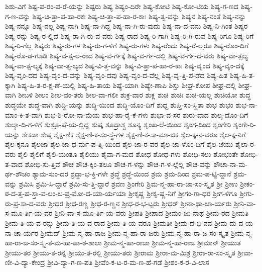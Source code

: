 {ಶಿಶು-ವಿಗೆ
ಶಿಷ್ಟ-ಪ-ರಂ-ಪ-ರೆ-ಯನ್ನು
ಶಿಷ್ಟರು
ಶಿಷ್ಯ
ಶಿಷ್ಯಂ-ದಿರೇ
ಶಿಷ್ಯ-ಕೋಟಿ
ಶಿಷ್ಯ-ಕೋ-ಟಿಯ
ಶಿಷ್ಯ-ಗ-ಣದ
ಶಿಷ್ಯ-ಗ-ಣ-ವನ್ನು
ಶಿಷ್ಯ-ಚಿ-ತ್ತಾ-ಪ-ಹಾ-ರಕಃ
ಶಿಷ್ಯ-ಚಿ-ತ್ತಾ-ಪ-ಹಾ-ರ-ಕಾಃ
ಶಿಷ್ಯ-ತ್ವ-ವನ್ನು
ಶಿಷ್ಯನ
ಶಿಷ್ಯ-ನಂತೆ
ಶಿಷ್ಯ-ನನ್ನು
ಶಿಷ್ಯ-ನನ್ನೂ
ಶಿಷ್ಯ-ನಲ್ಲ
ಶಿಷ್ಯ-ನಾಗಿ
ಶಿಷ್ಯ-ನಾ-ಗಿದ್ದ
ಶಿಷ್ಯ-ನಾ-ಗಿ-ರು-ವುದು
ಶಿಷ್ಯ-ನಾ-ದ-ವನು
ಶಿಷ್ಯ-ನಿ-ಗಿಂತ
ಶಿಷ್ಯರ
ಶಿಷ್ಯ-ರನ್ನು
ಶಿಷ್ಯ-ರ-ಲ್ಲಿದೆ
ಶಿಷ್ಯ-ರಾ-ಗಿ-ರು-ವ-ವರು
ಶಿಷ್ಯ-ರಾದ
ಶಿಷ್ಯ-ರಿ-ಗಾಗಿ
ಶಿಷ್ಯ-ರಿ-ಗಿ-ರುವ
ಶಿಷ್ಯ-ರಿಗೂ
ಶಿಷ್ಯ-ರಿಗೆ
ಶಿಷ್ಯ-ರಿ-ಗೆಲ್ಲ
ಶಿಷ್ಯರು
ಶಿಷ್ಯ-ರು-ಗಳ
ಶಿಷ್ಯ-ರು-ಗ-ಳಿಗೆ
ಶಿಷ್ಯ-ರು-ಗಳು
ಶಿಷ್ಯ-ರೆಂದು
ಶಿಷ್ಯ-ರೆ-ಲ್ಲರೂ
ಶಿಷ್ಯ-ರೊಂ-ದಿಗೆ
ಶಿಷ್ಯ-ರೊ-ಡ-ಗೂಡಿ
ಶಿಷ್ಯ-ವ-ತ್ಸ-ಲ-ರಾದ
ಶಿಷ್ಯ-ವ-ರ್ಗಕ್ಕೆ
ಶಿಷ್ಯ-ವ-ರ್ಗ-ದಲ್ಲಿ
ಶಿಷ್ಯ-ವ-ರ್ಗ-ದ-ವರು
ಶಿಷ್ಯ-ವಾ-ತ್ಸಲ್ಯ
ಶಿಷ್ಯ-ವಾ-ತ್ಸ-ಲ್ಯಕ್ಕೆ
ಶಿಷ್ಯ-ವಾ-ತ್ಸ-ಲ್ಯದ
ಶಿಷ್ಯ-ವಿ-ತ್ತ-ವನ್ನು
ಶಿಷ್ಯ-ವಿ-ತ್ತಾ-ಪ-ಹಾ-ರ-ಕಾಃ
ಶಿಷ್ಯ-ವೃಂದ
ಶಿಷ್ಯ-ವೃಂ-ದಕ್ಕೆ
ಶಿಷ್ಯ-ವೃಂ-ದದ
ಶಿಷ್ಯ-ವೃಂ-ದ-ವನ್ನು
ಶಿಷ್ಯ-ವೃಂ-ದವು
ಶಿಷ್ಯ-ವೃಂ-ದ-ವೆಲ್ಲ
ಶಿಷ್ಯ-ವೃ-ತ್ತಿ-ಪ-ಡೆದ
ಶಿಷ್ಯ-ಹಿತ
ಶಿಷ್ಯ-ಹಿ-ತ-ಕ್ಕಾಗಿ
ಶಿಷ್ಯ-ಹಿ-ತ-ರ-ಕ್ಷ-ಣೆ-ಯಲ್ಲಿ
ಶಿಷ್ಯ-ಹಿ-ತಾಯ
ಶಿಷ್ಯೆ-ಯಾಗಿ
ಶಿಷ್ಯೇ-ಣಾಪಿ
ಶಿಸ್ತು
ಶೀಘ್ರ-ಕೋಪ
ಶೀಘ್ರ-ದಲ್ಲಿ
ಶೀಘ್ರ-ವಾಗಿ
ಶೀಬಳಿ
ಶೀಲಂ
ಶೀಲ-ವಂ-ತರು
ಶೀಲ-ವಾ-ಗಲೀ
ಶುಕ್ರ-ವಾರ
ಶುಕ್ಲ
ಶುಚಿ
ಶುಚಿಃ
ಶುಚಿ-ಯಲ್ಲ
ಶುಚಿಯೋ
ಶುದ್ಧ
ಶುದ್ಧಯೇ
ಶುದ್ಧ-ವಾಗಿ
ಶುದ್ಧಿ-ಯನ್ನು
ಶುದ್ಧಿ-ಯಿಂದ
ಶುದ್ಧಿ-ಯೊಂ-ದಿಗೆ
ಶುಧ್ದ
ಶುಪ್ತಿ-ಸಂ-ಸ್ಥಿತಾ
ಶುಭ
ಶುಭಂ
ಶುಭ-ನಾ-ಮಾಂ-ಕಿ-ತ-ವಾಗಿ
ಶುಭ-ಶಿ-ರೋ-ನಾ-ಮೆಯ
ಶುಭ-ಹಾ-ರೈ-ಕೆ-ಗಳು
ಶುಭಾ-ವ-ಸರ
ಶುರು-ವಾದ
ಶುಲ್ಕ-ದೊಂ-ದಿಗೆ
ಶುಲ್ಕಾ-ದಿ-ಗ-ಳಿಗೆ
ಶುಶ್ರೂ-ಷೆ-ಯ-ಲ್ಲಿದ್ದ
ಶುಷ್ಕ
ಶೂದ್ರಾಶ್ಚ
ಶೂನ್ಯ
ಶೃಂಖ-ಲೆ-ಯಿಂದ
ಶೃಂಗ-ದಿಂದ
ಶೃಂಗೇರಿ
ಶೃಂಗೇ-ರಿ-ಯನ್ನು
ಶೇಕಡಾ
ಶೇಷ್ಠ
ಶೈಕ್ಷ-ಣಿಕ
ಶೈಕ್ಷ-ಣಿ-ಕ-ಸಂ-ಸ್ಥೆ-ಗಳ
ಶೈಕ್ಷ-ಣಿ-ಕ-ಸಾ-ಮಾ-ಜಿಕ
ಶೈಲ-ಕ್ಕ-ನ-ವರೂ
ಶೈಲ-ಕ್ಕ-ನಿಗೆ
ಶೈಲ-ಕ್ಕನೂ
ಶೈಲಜಾ
ಶೈಲ-ಜಾ-ಧ-ರ್ಮ-ಪ-ತ್ನಿ-ಯಿಂದ
ಶೈಲ-ಜಾ-ರ-ವರ
ಶೈಲ-ಜಾ-ಳೊಂ-ದಿಗೆ
ಶೈಲ-ಜೆಯು
ಶೈಲಾ-ರ-ವರು
ಶೈಲಿ
ಶೈಲಿಗೆ
ಶೈಲಿ-ಯಂತೂ
ಶೈಲಿಯು
ಶೈವಾ-ಗ-ಮದ
ಶೋಧ
ಶೋಧ-ಗಳು
ಶೋಧಿ-ಸಲು
ಶೋಭಂತೇ
ಶೋಭಿ-ತ-ವಾದ
ಶೋಭಿ-ಸು-ತ್ತಿವೆ
ಶೌಚ
ಶೌಚ-ಕ್ಕಿಂ-ತಲೂ
ಶೌಚ-ಗ-ಳನ್ನು
ಶೌಚ-ಗ-ಳ-ಲ್ಲೆಲ್ಲ
ಶೌಚ-ವನ್ನು
ಶೌಚಾ-ನಾ-ಮ-ರ್ಥ-ಶೌಚಂ
ಶ್ಯಾಮ-ಸುಂ-ದರ
ಶ್ರದ್ಧಾ-ಭ-ಕ್ತಿ-ಗಳೇ
ಶ್ರದ್ಧೆ
ಶ್ರದ್ಧೆ-ಯಿಂದ
ಶ್ರಮ
ಶ್ರಮ-ದಿಂದ
ಶ್ರಮ-ಪ-ಟ್ಟಿ-ದ್ದಾನೆ
ಶ್ರಮ-ವನ್ನು
ಶ್ರಮಿಸಿ
ಶ್ರಮಿ-ಸಿ-ದ್ದಾರೆ
ಶ್ರಮಿ-ಸು-ತ್ತಿ-ದ್ದಾರೆ
ಶ್ರವಣ
ಶ್ರಿಂಗೇರಿ
ಶ್ರಿಮ-ನ್ಮ-ಹಾ-ರಾ-ಜಾ-ಸಂ-ಸ್ಕೃತ
ಶ್ರೀ
ಶ್ರೀಉ
ಶ್ರೀಕಂ-ಠ-ದ-ತ್ತ-ಹ-ಸ್ತಾ-ವ-ಲಂ-ಬ-ಪ್ರ-ಮೋ-ದ-ಯಾ-ರ್ಯಯಾ
ಶ್ರೀಕೃಷ್ಣ
ಶ್ರೀಕೃ-ಷ್ಣ-ನಿಗೆ
ಶ್ರೀಗಂ-ಗಾ-ಧರ
ಶ್ರೀಗ-ಳಿಗೂ
ಶ್ರೀಗು-ರು-ಪ್ರ-ಸಾ-ದ-ವರು
ಶ್ರೀಧರ
ಶ್ರೀಧ-ರಣ್ಣ
ಶ್ರೀಧ-ರ-ಣ್ಣನ
ಶ್ರೀಧ-ರ-ಭ-ಟ್ಟರು
ಶ್ರೀಧರ್
ಶ್ರೀನಾ-ಥಾ-ಚಾ-ರ್ಯರು
ಶ್ರೀನಿ-ವಾ-ಸ-ಮೂ-ರ್ತಿ-ಯ-ವರ
ಶ್ರೀನಿ-ವಾ-ಸ-ಮೂ-ರ್ತಿ-ಯ-ವರು
ಶ್ರೀಪತಿ
ಶ್ರೀಪಾದ
ಶ್ರೀಮಂ-ಜು-ನಾಥ
ಶ್ರೀಮ-ಠದ
ಶ್ರೀಮತಿ
ಶ್ರೀಮ-ತಿ-ಯ-ವ-ರನ್ನು
ಶ್ರೀಮ-ತಿ-ಯ-ವ-ರಾದ
ಶ್ರೀಮ-ತಿ-ಯ-ವರೂ
ಶ್ರೀಮತೀ
ಶ್ರೀಮ-ದ-ಭಿ-ನವ
ಶ್ರೀಮ-ದು-ದ-ಯ-ನಾ-ಚಾ-ರ್ಯರ
ಶ್ರೀಮದ್
ಶ್ರೀಮ-ನ್ಮ-ಹಾ-ರಾಜ
ಶ್ರೀಮ-ನ್ಮ-ಹಾ-ರಾ-ಜರು
ಶ್ರೀಮ-ನ್ಮ-ಹಾ-ರಾ-ಜ-ಸಂ-ಸ್ಕೃತ
ಶ್ರೀಮ-ನ್ಮ-ಹಾ-ರಾ-ಜ-ಸಂ-ಸ್ಕೃ-ತ-ಮ-ಹಾ-ಪಾ-ಠ-ಶಾಲಾ
ಶ್ರೀಮ-ನ್ಮ-ಹಾ-ರಾಜಾ
ಶ್ರೀಮ-ನ್ಮ-ಹಾ-ರಾಜ
ಶ್ರೀಮಾನ್
ಶ್ರೀಯುತ
ಶ್ರೀಯು-ತರ
ಶ್ರೀಯು-ತ-ರನ್ನ
ಶ್ರೀಯು-ತ-ರಲ್ಲಿ
ಶ್ರೀಯು-ತರು
ಶ್ರೀರಾಮ
ಶ್ರೀರಾ-ಮ-ಮಿಶ್ರ
ಶ್ರೀರಾ-ರಾ-ಸಂ-ಸ್ಕೃತ
ಶ್ರೀವಾ-ಣೀ-ವಿ-ದ್ಯಾ-ಕೇಂದ್ರ
ಶ್ರೀವಿ-ದ್ಯಾ-ಗ-ಣ-ಪತಿ
ಶ್ರೀವೆಂ-ಕ-ಟ-ರ-ಮ-ಣ-ಹೆ-ಗಡೆ
ಶ್ರೀಶಂ-ಕ-ರ-ವಿ-ಲಾಸ
}
